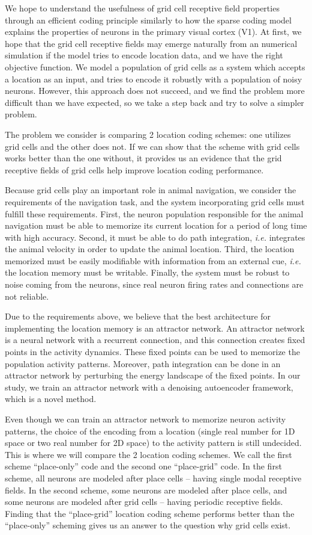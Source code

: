 We hope to understand the usefulness of grid cell receptive field properties through an efficient coding principle similarly to how the sparse coding model explains the properties of neurons in the primary visual cortex (V1). At first, we hope that the grid cell receptive fields may emerge naturally from an numerical simulation if the model tries to encode location data, and we have the right objective function. We model a population of grid cells as a system which accepts a location as an input, and tries to encode it robustly with a population of noisy neurons. However, this approach does not succeed, and we find the problem more difficult than we have expected, so we take a step back and try to solve a simpler problem.

The problem we consider is comparing 2 location coding schemes: one utilizes grid cells and the other does not. If we can show that the scheme with grid cells works better than the one without, it  provides us an evidence that the grid receptive fields of grid cells help improve location coding performance.

Because grid cells play an important role in animal navigation, we consider the requirements of the navigation task, and the system incorporating grid cells must fulfill these requirements. First, the neuron population responsible for the animal navigation must be able to memorize its current location for a period of long time with high accuracy. Second, it must be able to do path integration, \textit{i.e.} integrates the animal velocity in order to update the animal location. Third, the location memorized must be easily modifiable with information from an external cue, \textit{i.e.} the location memory must be writable. Finally, the system must be robust to noise coming from the neurons, since real neuron firing rates and connections are not reliable.

Due to the requirements above, we believe that the best architecture for implementing the location memory is an attractor network. An attractor network is a neural network with a recurrent connection, and this connection creates fixed points in the activity dynamics. These fixed points can be used to memorize the population activity patterns. Moreover, path integration can be done in an attractor network by perturbing the energy landscape of the fixed points. In our study, we train an attractor network with a denoising autoencoder framework, which is a novel method.

Even though we can train an attractor network to memorize neuron activity patterns, the choice of the encoding from a location (single real number for 1D space or two real number for 2D space) to the activity pattern is still undecided. This is where we will compare the 2 location coding schemes. We call the first scheme ``place-only'' code and the second one ``place-grid'' code. In the first scheme, all neurons are modeled after place cells -- having single modal receptive fields. In the second scheme, some neurons are modeled after place cells, and some neurons are modeled after grid cells -- having periodic receptive fields. Finding that the ``place-grid'' location coding scheme performs better than the ``place-only'' scheming gives us an answer to the question why grid cells exist.

